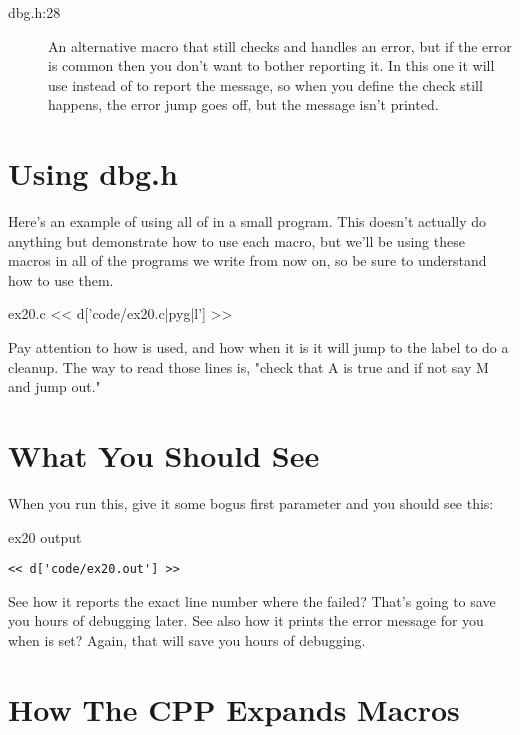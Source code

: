 \begin{description}
\item[dbg.h:28] An alternative macro  that still checks and
    handles an error, but if the error is common then you don't want to bother
    reporting it.  In this one it will use  instead of 
    to report the message, so when you define  the check still
    happens, the error jump goes off, but the message isn't printed.
\end{description}

\section{Using dbg.h}

Here's an example of using all of  in a small program.
This doesn't actually do anything but demonstrate how to use each
macro, but we'll be using these macros in all of the programs we
write from now on, so be sure to understand how to use them.

\begin{code}{ex20.c}
<< d['code/ex20.c|pyg|l'] >>
\end{code}

Pay attention to how  is used, and how when it is
 it will jump to the  label to do a cleanup.
The way to read those lines is, "check that A is true and if not say M
and jump out."

\section{What You Should See}

When you run this, give it some bogus first parameter and you should see
this:

\begin{code}{ex20 output}
\begin{lstlisting}
<< d['code/ex20.out'] >>
\end{lstlisting}
\end{code}

See how it reports the exact line number where the  failed?
That's going to save you hours of debugging later.  See also how it 
prints the error message for you when  is set? Again,
that will save you hours of debugging.

\section{How The CPP Expands Macros}

